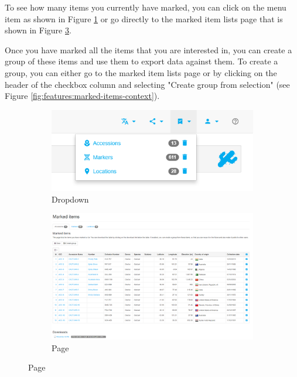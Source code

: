 To see how many items you currently have marked, you can click on the menu item as shown in Figure \ref{fig:features:marked-items-dropdown} or go directly to the marked item lists page that is shown in Figure \ref{fig:features:marked-items-page}.

Once you have marked all the items that you are interested in, you can create a group of these items and use them to export data against them. To create a group, you can either go to the marked item lists page or by clicking on the header of the checkbox column and selecting "Create group from selection" (see Figure \ref{fig:features:marked-items-context}).

\begin{figure}
	\centering
	\begin{subfigure}[b]{0.2\linewidth}
		\includegraphics[width=1\linewidth]{img/features/item-list-dropdown.png}
		\caption{Dropdown}
		\label{fig:features:marked-items-dropdown}
	\end{subfigure}
	\begin{subfigure}[b]{0.58\linewidth}
		\includegraphics[width=1\linewidth]{img/features/item-list-page.png}
		\caption{Page}
		\label{fig:features:marked-items-page}
	\end{subfigure}

\end{figure}
